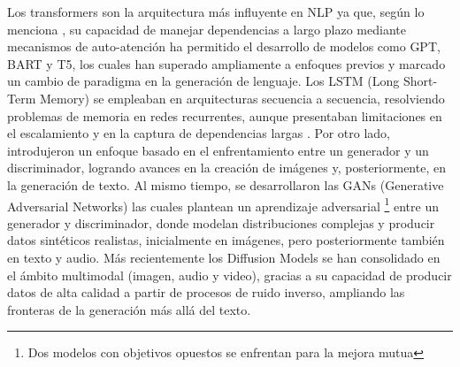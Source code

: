 Los transformers son la arquitectura más influyente en NLP ya que, según lo menciona \textcite{casola2022pretrained}, su capacidad de manejar dependencias a largo plazo 
mediante mecanismos de auto-atención ha permitido el desarrollo de modelos como GPT, BART y T5, los cuales han superado ampliamente a enfoques previos y marcado un cambio 
de paradigma en la generación de lenguaje. Los LSTM (Long Short-Term Memory) se empleaban en arquitecturas secuencia a secuencia, resolviendo problemas de memoria en redes recurrentes, 
aunque presentaban limitaciones en el escalamiento y en la captura de dependencias largas \parencite{jing2024vecdb}. Por otro lado, introdujeron un enfoque basado 
en el enfrentamiento entre un generador y un discriminador, logrando avances en la creación de imágenes y, posteriormente, en la generación de texto. 
Al mismo tiempo, se desarrollaron las GANs (Generative Adversarial Networks) las cuales plantean un aprendizaje adversarial \footnote{ Dos modelos 
con objetivos opuestos se enfrentan para la mejora mutua} entre un generador y discriminador, donde modelan distribuciones complejas 
y producir datos sintéticos realistas, inicialmente en imágenes, pero posteriormente también en texto y audio.
Más recientemente los Diffusion Models
se han consolidado en el ámbito multimodal (imagen, audio y video), gracias a su capacidad de producir datos de alta calidad a partir de procesos de ruido inverso,
ampliando las fronteras de la generación más allá del texto. 

